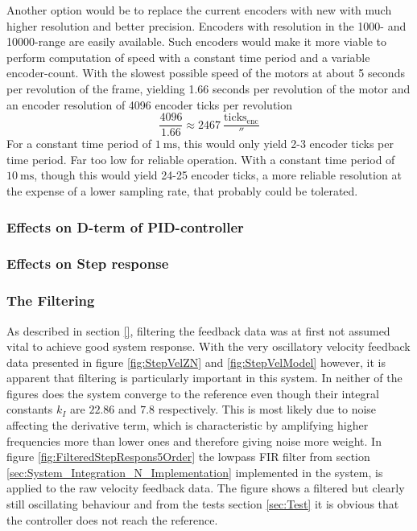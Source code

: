 \documentclass[../../main.tex]{subfiles}
\begin{document}
Another option would be to replace the current encoders with new with much higher resolution and better precision. Encoders with resolution in the 1000- and 10000-range are easily available. Such encoders would make it more viable to perform computation of speed with a constant time period and a variable encoder-count. With the slowest possible speed of the motors at about 5 seconds per revolution of the frame, yielding 1.66 seconds per revolution of the motor and an encoder resolution of 4096 encoder ticks per revolution 
\begin{equation}
    \frac{4096}{1.66} \approx \SI{ 2467 }{ \frac{ \mathrm{ ticks_{enc} } }{ \second } } 
\end{equation}
For a constant time period of $\SI{ 1 }{ \milli \second }$, this would only yield 2-3 encoder ticks per time period. Far too low for reliable operation. With a constant time period of $\SI{ 10 }{ \milli \second }$, though this would yield 24-25 encoder ticks, a more reliable resolution at the expense of a lower sampling rate, that probably could be tolerated.

\subsubsection*{Effects on D-term of PID-controller}

\subsubsection*{Effects on Step response}

\subsubsection*{The Filtering} \label{subsec:TheFiltering}
As described in section \ref{}, filtering the feedback data was at first not assumed vital to achieve good system response. With the very oscillatory velocity feedback data presented in figure \ref{fig:StepVelZN} and \ref{fig:StepVelModel} however, it is apparent that filtering is particularly important in this system. In neither of the figures does the system converge to the reference even though their integral constants $k_I$ are $22.86$ and $7.8$ respectively. This is most likely due to noise affecting the derivative term, which is characteristic by amplifying higher frequencies more than lower ones and therefore giving noise more weight. In figure \ref{fig:FilteredStepRespons5Order} the lowpass FIR filter from section \ref{sec:System_Integration_N_Implementation} implemented in the system, is applied to the raw velocity feedback data. The figure shows a filtered but clearly still oscillating behaviour and from the tests section \ref{sec:Test} it is obvious that the controller does not reach the reference.\\
\end{document}
